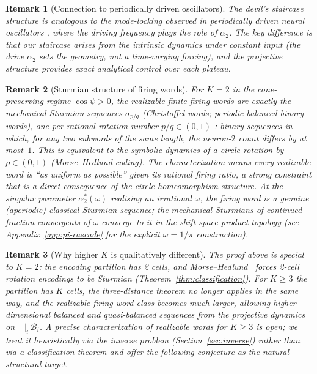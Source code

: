 \documentclass[12pt]{article}
\newcommand{\Bsp}{\mathcal{B}}
\newtheorem{remark}{Remark}
\begin{document}
\begin{remark}[Connection to periodically driven oscillators]\label{app-rem:driven-oscillators}
The devil's staircase structure is analogous to the mode-locking observed in periodically driven neural oscillators \citep{glass1988clocks}, where the driving frequency plays the role of $\alpha_2$.
The key difference is that our staircase arises from the intrinsic dynamics under constant input (the drive $\alpha_2$ sets the geometry, not a time-varying forcing), and the projective structure provides exact analytical control over each plateau.
\end{remark}

\begin{remark}[Sturmian structure of firing words]\label{app-rem:sturmian}
For $K=2$ in the cone-preserving regime $\cos\psi>0$, the realizable finite firing words are exactly the \emph{mechanical Sturmian} sequences $\sigma_{p/q}$ (Christoffel words; periodic-balanced binary words), one per rational rotation number $p/q\in(0,1)$ \citep{lothaire2002algebraic}: binary sequences in which, for any two subwords of the same length, the neuron-$2$ count differs by at most~$1$.
This is equivalent to the symbolic dynamics of a circle rotation by $\rho\in(0,1)$ (Morse--Hedlund coding).
The characterization means every realizable word is ``as uniform as possible'' given its rational firing ratio, a strong constraint that is a direct consequence of the circle-homeomorphism structure. At the singular parameter $\alpha_2^*(\omega)$ realising an irrational $\omega$, the firing word is a genuine (aperiodic) classical Sturmian sequence; the mechanical Sturmians of continued-fraction convergents of $\omega$ converge to it in the shift-space product topology (see Appendix~\ref{app:pi-cascade} for the explicit $\omega=1/\pi$ construction).
\end{remark}

\begin{remark}[Why higher $K$ is qualitatively different]\label{app-rem:K-geq-3-richer}
The proof above is special to $K{=}2$: the encoding partition has 2 cells, and Morse--Hedlund~\citep{morse1938symbolic,morse1940symbolic} forces 2-cell rotation encodings to be Sturmian (Theorem~\ref{thm:classification}). For $K\geq 3$ the partition has $K$ cells, the three-distance theorem no longer applies in the same way, and the realizable firing-word class becomes much larger, allowing higher-dimensional balanced and quasi-balanced sequences from the projective dynamics on $\bigsqcup_i\Bsp_i$. A precise characterization of realizable words for $K\geq 3$ is open; we treat it heuristically via the inverse problem (Section~\ref{sec:inverse}) rather than via a classification theorem and offer the following conjecture as the natural structural target.
\end{remark}
\end{document}
